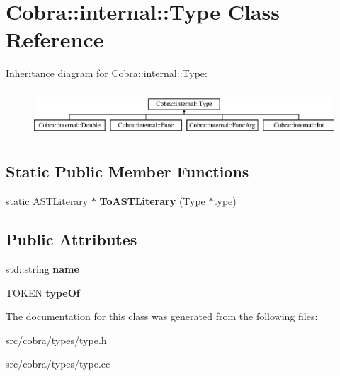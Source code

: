 \hypertarget{class_cobra_1_1internal_1_1_type}{\section{Cobra\+:\+:internal\+:\+:Type Class Reference}
\label{class_cobra_1_1internal_1_1_type}
}
Inheritance diagram for Cobra\+:\+:internal\+:\+:Type\+:\begin{figure}[H]
\begin{center}
\leavevmode
\includegraphics[height=1.761006cm]{class_cobra_1_1internal_1_1_type}
\end{center}
\end{figure}
\subsection*{Static Public Member Functions}
\begin{DoxyCompactItemize}
\item 
\hypertarget{class_cobra_1_1internal_1_1_type_a5f7c3b700a016358f9774957e3f1412a}{static \hyperlink{class_cobra_1_1internal_1_1_a_s_t_literary}{A\+S\+T\+Literary} $\ast$ {\bfseries To\+A\+S\+T\+Literary} (\hyperlink{class_cobra_1_1internal_1_1_type}{Type} $\ast$type)}\label{class_cobra_1_1internal_1_1_type_a5f7c3b700a016358f9774957e3f1412a}

\end{DoxyCompactItemize}
\subsection*{Public Attributes}
\begin{DoxyCompactItemize}
\item 
\hypertarget{class_cobra_1_1internal_1_1_type_a1e2d6e1ce543e5f0a7729335fc2ec6b3}{std\+::string {\bfseries name}}\label{class_cobra_1_1internal_1_1_type_a1e2d6e1ce543e5f0a7729335fc2ec6b3}

\item 
\hypertarget{class_cobra_1_1internal_1_1_type_aa6262f086aacd621ade53523f70b80a1}{T\+O\+K\+E\+N {\bfseries type\+Of}}\label{class_cobra_1_1internal_1_1_type_aa6262f086aacd621ade53523f70b80a1}

\end{DoxyCompactItemize}


The documentation for this class was generated from the following files\+:\begin{DoxyCompactItemize}
\item 
src/cobra/types/type.\+h\item 
src/cobra/types/type.\+cc\end{DoxyCompactItemize}
